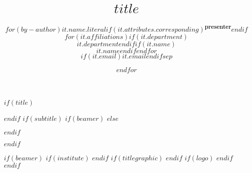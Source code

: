 $if(title)$
\title{\huge \vspace*{-\baselineskip}$title$}
$endif$
$if(subtitle)$
$if(beamer)$
$else$
\usepackage{etoolbox}
\makeatletter
\providecommand{\subtitle}[1]{%
  \apptocmd{\@title}{\par {\large #1 \par}}{}{}
}
\makeatother
$endif$
\subtitle{$subtitle$}
$endif$
\author{$for(by-author)$\textbf{$it.name.literal$$if(it.attributes.corresponding)$\textsuperscript{presenter}$endif$}$for(it.affiliations)$$if(it.department)$\\$it.department$$endif$$if(it.name)$\\$it.name$$endif$$endfor$\\$if(it.email)$$it.email$$endif$$sep$ \and $endfor$}
\date{ }
$if(beamer)$
$if(institute)$
$endif$
$if(titlegraphic)$
$endif$
$if(logo)$
$endif$
$endif$